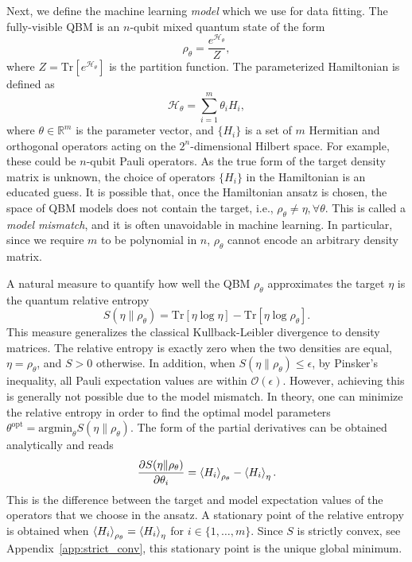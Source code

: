 \documentclass[
    aps,
    prx,
    floatfix,
    nofootinbib,
    onecolumn
]{revtex4-2}
\newcommand{\Tr}{\mathrm{Tr}}
\begin{document}
Next, we define the machine learning \emph{model} which we use for data fitting. The fully-visible QBM is an $n$-qubit mixed quantum state of the form 
\begin{equation}
    \rho_\theta = \frac{e^{\mathcal{H}_\theta}}{Z}, 
\end{equation} 
where $Z=\Tr[e^{\mathcal{H}_\theta}]$ is the partition function. The parameterized Hamiltonian is defined as 
\begin{equation}
\label{eq:generic_H}
    \mathcal{H}_\theta = \sum_{i=1}^m \theta_i H_i,
\end{equation} 
where $\theta \in \mathbb{R}^m$ is the parameter vector, and $\{H_i\}$ is a set of $m$ Hermitian and orthogonal operators acting on the $2^n$-dimensional Hilbert space. For example, these could be $n$-qubit Pauli operators. As the true form of the target density matrix is unknown, the choice of operators $\{ H_i \}$ in the Hamiltonian is an educated guess. It is possible that, once the Hamiltonian ansatz is chosen, the space of QBM models does not contain the target, i.e., $\rho_\theta \neq \eta, \forall \theta$. This is called a \emph{model mismatch}, and it is often unavoidable in machine learning. In particular, since we require $m$ to be polynomial in $n$, $\rho_\theta$ cannot encode an arbitrary density matrix.

A natural measure to quantify how well the QBM $\rho_\theta$ approximates the target $\eta$ is the quantum relative entropy
\begin{equation}
\label{eq:RelEnt}
    S(\eta \| \rho_\theta) = \Tr[\eta \log{\eta}] - \Tr[\eta \log{\rho_\theta}]. 
\end{equation} 
This measure generalizes the classical Kullback-Leibler divergence to density matrices.
The relative entropy is exactly zero when the two densities are equal, $\eta=\rho_\theta$, and $S > 0$ otherwise. In addition, when $S(\eta \| \rho_\theta)\leq\epsilon$, by Pinsker's inequality, all Pauli expectation values are within $\mathcal{O}(\epsilon)$. However, achieving this is generally not possible due to the model mismatch. In theory, one can minimize the relative entropy in order to find the optimal model parameters $\theta^{\mathrm{opt}}=\mathrm{argmin}_{\theta}S(\eta \| \rho_\theta)$. The form of the partial derivatives can be obtained analytically and reads
\begin{equation}
\label{eq:RelEntropDeriv}
    \frac{\partial S(\eta\|\rho_\theta)}{\partial \theta_i} = \expval{H_i}_{\rho_\theta} - \expval{H_i}_\eta . 
\end{equation}
This is the difference between the target and model expectation values of the operators that we choose in the ansatz. A stationary point of the relative entropy is obtained when $\expval{H_i}_{\rho_\theta} = \expval{H_i}_\eta$ for $i \in \{1, \dots, m\}$. Since $S$ is strictly convex, see Appendix~\ref{app:strict_conv}, this stationary point is the unique global minimum. 
\end{document}
